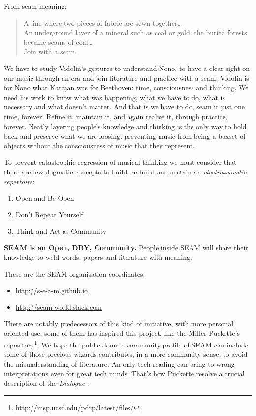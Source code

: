 \documentclass[twoside,a4paper]{article}
\begin{document}
From seam meaning:

\begin{quote}
\begin{it}
A line where two pieces of fabric are sewn together\ldots \\
An underground layer of a mineral such as coal or gold: the buried forests
became seams of coal\ldots\\
Join with a seam.
\end{it}
\end{quote}

We have to study Vidolin's gestures to understand Nono, to have a clear sight on
our music through an era and join literature and practice with a seam. Vidolin is
for Nono what Karajan was for Beethoven: time, consciousness and thinking. We
need his work to know what was happening, what we have to do, what is necessary
and what doesn't matter. And that is we have to do, seam it just one time,
forever. Refine it, maintain it, and again realise it, through practice, forever.
Neatly layering people's knowledge and thinking is the only way to hold back and
preserve what we are loosing, preventing music from being a boxset of objects
without the consciousness of music that they represent.

To prevent catastrophic regression of musical thinking we must consider that
there are few dogmatic concepts to build, re-build and sustain an
\emph{electroacoustic repertoire}:

\begin{enumerate}
  \item Open and Be Open
  \item Don't Repeat Yourself
  \item Think and Act as Community
\end{enumerate}

\textbf{SEAM is an Open, DRY, Community.} People inside SEAM will share their
knowledge to weld words, papers and literature with meaning.

These are the SEAM organisation coordinates:
\begin{itemize}
\item \url{http://s-e-a-m.github.io}
\item \url{http://seam-world.slack.com}
\end{itemize}

There are notably predecessors of this kind of initiative, with more personal
oriented use, some of them has inspired this project, like the Miller Puckette's
repository\footnote{\url{http://msp.ucsd.edu/pdrp/latest/files/}}. We hope the
public domain community profile of SEAM can include some of those precious
wizards contributes, in a more community sense, to avoid the misunderstanding
of literature. An only-tech reading can bring to wrong interpretations even for
great tech minds. That's how Puckette \cite{mp01} resolve a crucial description
of the \emph{Dialogue} \cite{pbdod85}:
\end{document}

